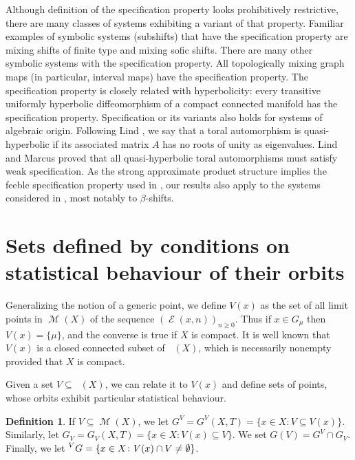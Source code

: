 \documentclass{amsart}
\theoremstyle{definition}
\newtheorem{defn}[thm]{Definition}
\DeclareMathOperator{\Emp}{\mathcal{E}}%
\DeclareMathOperator{\M}{\mathcal{M}}
\DeclareMathOperator{\MT}{\mathcal{M}_{\mathit T} }
\begin{document}
Although definition of the specification property looks prohibitively restrictive, there are many classes of systems exhibiting a variant of that property.
Familiar examples of symbolic systems (subshifts) that have the specification property are mixing shifts of
finite type and mixing sofic shifts. There are many other symbolic systems with the specification property. All topologically mixing graph maps (in particular, interval maps) have the specification property.
The specification property is closely related with hyperbolicity: every transitive uniformly hyperbolic diffeomorphism of a compact connected manifold has the specification property.
Specification or its variants also holds for systems of algebraic origin. Following Lind \cite{Lind}, we say that a toral automorphism is quasi-hyperbolic if
its associated matrix $A$ has no roots of unity as eigenvalues.
Lind \cite[Theorem (ii)--(iii)]{Lind} and Marcus \cite{Marcus} proved that all quasi-hyperbolic toral automorphisms must satisfy weak specification.
As  the strong approximate product structure implies  the feeble specification property used in \cite{AJKM}, our results also apply to the systems considered in \cite{AJKM}, most notably to $\beta$-shifts.








\section{Sets defined by conditions on statistical behaviour of their orbits}\label{sec:SOI-def}

Generalizing the notion of a generic point, we define $V(x)$ as the set of all limit points in $\M(X)$
of the sequence $(\Emp(x,n))_{n\ge 0}$. Thus if $x\in G_\mu$ then $V(x)=\{\mu\}$, and the converse is true if $X$ is compact.
It is well known that $V(x)$ is a closed connected subset of $\MT(X)$,
which is necessarily nonempty provided that $X$ is compact.

Given a set $V\subseteq \MT(X)$, we can relate it to $V(x)$ and define sets of points, whose orbits exhibit particular statistical behaviour.

\begin{defn}
If $V\subseteq \M(X)$, we let $G^V=G^V(X,T)=\{ x \in X \colon V\subseteq V(x) \}$.
Similarly, let $G_V=G_V(X,T)=\{ x \in X \colon V(x) \subseteq V\}$.
We set  $G(V)= G^V \cap G_V$. Finally, we let $\prescript{V}{} G =
\{ x \in X \colon V(x)\cap V \neq \emptyset\}$.
\end{defn}
\end{document}
